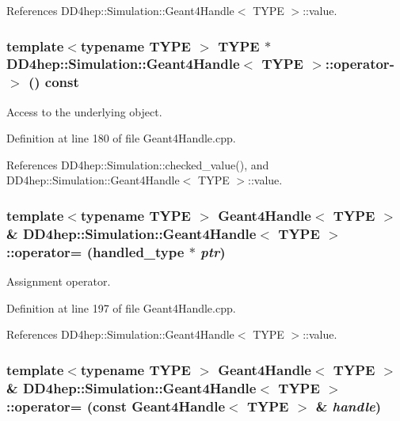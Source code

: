 References DD4hep::Simulation::Geant4Handle$<$ TYPE $>$::value.\hypertarget{class_d_d4hep_1_1_simulation_1_1_geant4_handle_a9404f8a821a678333390b2643809e975}{
\subsubsection[{operator-\/$>$}]{\setlength{\rightskip}{0pt plus 5cm}template$<$typename TYPE $>$ TYPE $\ast$ {\bf DD4hep::Simulation::Geant4Handle}$<$ TYPE $>$::operator-\/$>$ () const}}
\label{class_d_d4hep_1_1_simulation_1_1_geant4_handle_a9404f8a821a678333390b2643809e975}


Access to the underlying object. 

Definition at line 180 of file Geant4Handle.cpp.

References DD4hep::Simulation::checked\_\-value(), and DD4hep::Simulation::Geant4Handle$<$ TYPE $>$::value.\hypertarget{class_d_d4hep_1_1_simulation_1_1_geant4_handle_ab249ffa125a4a3460135843a2fd83a75}{
\subsubsection[{operator=}]{\setlength{\rightskip}{0pt plus 5cm}template$<$typename TYPE $>$ {\bf Geant4Handle}$<$ TYPE $>$ \& {\bf DD4hep::Simulation::Geant4Handle}$<$ TYPE $>$::operator= ({\bf handled\_\-type} $\ast$ {\em ptr})}}
\label{class_d_d4hep_1_1_simulation_1_1_geant4_handle_ab249ffa125a4a3460135843a2fd83a75}


Assignment operator. 

Definition at line 197 of file Geant4Handle.cpp.

References DD4hep::Simulation::Geant4Handle$<$ TYPE $>$::value.\hypertarget{class_d_d4hep_1_1_simulation_1_1_geant4_handle_a92e5bb66d347989002bc13a328502e04}{
\subsubsection[{operator=}]{\setlength{\rightskip}{0pt plus 5cm}template$<$typename TYPE $>$ {\bf Geant4Handle}$<$ TYPE $>$ \& {\bf DD4hep::Simulation::Geant4Handle}$<$ TYPE $>$::operator= (const {\bf Geant4Handle}$<$ TYPE $>$ \& {\em handle})}}
\label{class_d_d4hep_1_1_simulation_1_1_geant4_handle_a92e5bb66d347989002bc13a328502e04}


